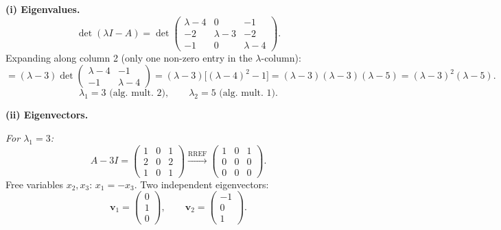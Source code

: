 \documentclass[12pt,a3paper]{article}
\begin{document}
 
\begin{tcolorbox}[enhanced,breakable,
  colback=cE!4,colframe=cE,boxrule=0.8pt,arc=5pt,
  title={\textbf{Answer --- Eigenvalues, Eigenvectors, Diagonalization \& $A^{100}$ for
    $A=\begin{pmatrix}4&0&1\\2&3&2\\1&0&4\end{pmatrix}$}},
  fonttitle=\bfseries\color{white},colbacktitle=cE]
 
\textbf{(i) Eigenvalues.}
\[
  \det(\lambda I - A)
  = \det\begin{pmatrix}\lambda-4&0&-1\\-2&\lambda-3&-2\\-1&0&\lambda-4\end{pmatrix}.
\]
Expanding along column 2 (only one non-zero entry in the $\lambda$-column):
\[
  = (\lambda-3)\det\begin{pmatrix}\lambda-4&-1\\-1&\lambda-4\end{pmatrix}
  = (\lambda-3)\bigl[(\lambda-4)^2 - 1\bigr]
  = (\lambda-3)(\lambda-3)(\lambda-5)
  = (\lambda-3)^2(\lambda-5).
\]
\[
  \boxed{\lambda_1 = 3 \text{ (alg.\ mult.\ 2)}, \qquad \lambda_2 = 5 \text{ (alg.\ mult.\ 1)}.}
\]
 
\medskip
\textbf{(ii) Eigenvectors.}
 
\textit{For $\lambda_1 = 3$:}
\[
  A - 3I = \begin{pmatrix}1&0&1\\2&0&2\\1&0&1\end{pmatrix}
  \xrightarrow{\text{RREF}}
  \begin{pmatrix}1&0&1\\0&0&0\\0&0&0\end{pmatrix}.
\]
Free variables $x_2, x_3$: $x_1 = -x_3$.  Two independent eigenvectors:
\[
  \mathbf{v}_1 = \begin{pmatrix}0\\1\\0\end{pmatrix}, \qquad
  \mathbf{v}_2 = \begin{pmatrix}-1\\0\\1\end{pmatrix}.
\]
 

\end{tcolorbox}
\end{document}
